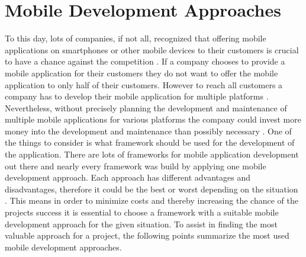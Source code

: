 \documentclass[Bachelor,BIF,english]{twbook}
\begin{document}
\newpage
\chapter{Mobile Development Approaches}
To this day, lots of companies, if not all, recognized that offering mobile applications on smartphones or other mobile devices to their customers is crucial to have a chance against the competition \cite[p.~1]{7479278}. If a company chooses to provide a mobile application for their customers they do not want to offer the mobile application to only half of their customers. However to reach all customers a company has to develop their mobile application for multiple platforms \cite[p.~5]{Steczko2016}.
\\[\baselineskip]
Nevertheless, without precisely planning the development and maintenance of multiple mobile applications for various platforms the company could invest more money into the development and maintenance than possibly necessary \cite[p.~1]{JohanssonSderberg2018} \cite[p.~8]{Steczko2016} \cite[p.~757]{Ciman2014}. One of the things to consider is what framework should be used for the development of the application. There are lots of frameworks for mobile application development out there and nearly every framework was build by applying one mobile development approach. Each approach has different advantages and disadvantages, therefore it could be the best or worst depending on the situation \cite{6420693} \cite{7934674}. This means in order to minimize costs and thereby increasing the chance of the projects success it is essential to choose a framework with a suitable mobile development approach for the given situation. To assist in finding the most valuable approach for a project, the following points summarize the most used mobile development approaches. 
\end{document}
